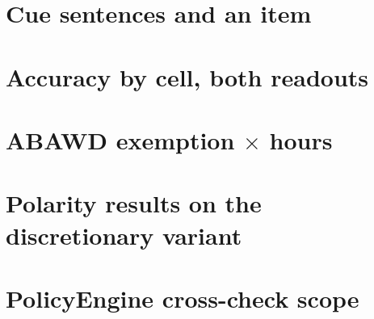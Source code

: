 \documentclass[11pt]{article}
\begin{document}
\section{Cue sentences and an item}
\section{Accuracy by cell, both readouts}
\section{ABAWD exemption $\times$ hours}
\section{Polarity results on the discretionary variant}
\section{PolicyEngine cross-check scope}
\end{document}
